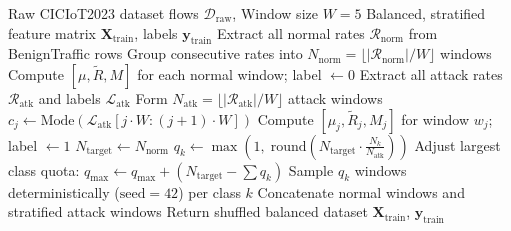 \documentclass[conference]{IEEEtran}
\begin{document}
\begin{algorithm}[htbp]
\caption{Deterministic Stratified Training Set Construction}
\label{alg_stratify}
\begin{algorithmic}[1]
\REQUIRE Raw CICIoT2023 dataset flows $\mathcal{D}_{\text{raw}}$, Window size $W=5$
\ENSURE Balanced, stratified feature matrix $\mathbf{X}_{\text{train}}$, labels $\mathbf{y}_{\text{train}}$
\STATE Extract all normal rates $\mathcal{R}_{\text{norm}}$ from BenignTraffic rows
\STATE Group consecutive rates into $N_{\text{norm}} = \lfloor |\mathcal{R}_{\text{norm}}| / W \rfloor$ windows
\STATE Compute $[\mu, \tilde{R}, M]$ for each normal window; label $\leftarrow 0$
\STATE Extract all attack rates $\mathcal{R}_{\text{atk}}$ and labels $\mathcal{L}_{\text{atk}}$
\STATE Form $N_{\text{atk}} = \lfloor |\mathcal{R}_{\text{atk}}| / W \rfloor$ attack windows
    \STATE $c_j \leftarrow \text{Mode}(\mathcal{L}_{\text{atk}}[j \cdot W : (j+1) \cdot W])$ 
    \STATE Compute $[\mu_j, \tilde{R}_j, M_j]$ for window $w_j$; label $\leftarrow 1$
\ENDFOR
\STATE $N_{\text{target}} \leftarrow N_{\text{norm}}$ 
    \STATE $q_k \leftarrow \max\left(1, \; \text{round}\left(N_{\text{target}} \cdot \frac{N_k}{N_{\text{atk}}}\right)\right)$
\ENDFOR
\STATE Adjust largest class quota: $q_{\text{max}} \leftarrow q_{\text{max}} + (N_{\text{target}} - \sum q_k)$
\STATE Sample $q_k$ windows deterministically ($\text{seed}=42$) per class $k$
\STATE Concatenate normal windows and stratified attack windows
\STATE Return shuffled balanced dataset $\mathbf{X}_{\text{train}}$, $\mathbf{y}_{\text{train}}$
\end{algorithmic}
\end{algorithm}
\end{document}
